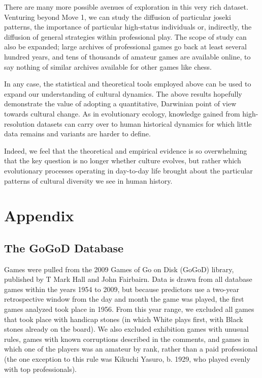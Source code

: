 \documentclass[reqno,12pt]{amsart}
\begin{document}
There are many more possible avenues of exploration in this very rich
dataset. Venturing beyond Move 1, we can study the diffusion of
particular joseki patterns, the importance of particular high-status
individuals or, indirectly, the diffusion of general strategies within
professional play. The scope of study can also be expanded; large
archives of professional games go back at least several hundred years,
and tens of thousands of amateur games are available online, to say
nothing of similar archives available for other games like chess.

In any case, the statistical and theoretical tools employed above can be
used to expand our understanding of cultural dynamics. The above results
hopefully demonstrate the value of adopting a quantitative, Darwinian
point of view towards cultural change. As in evolutionary ecology,
knowledge gained from high-resolution datasets can carry over to human
historical dynamics for which little data remains and variants are
harder to define.

Indeed, we feel that the theoretical and empirical evidence is so
overwhelming that the key question is no longer whether culture evolves,
but rather which evolutionary processes operating in day-to-day life
brought about the particular patterns of cultural diversity we see in
human history.



\newpage

\section{Appendix}\label{appendix}

\subsection{The GoGoD Database}\label{the-gogod-database}

Games were pulled from the 2009 Games of Go on Disk (GoGoD) library,
published by T Mark Hall and John Fairbairn. Data is drawn from all
database games within the years 1954 to 2009, but because predictors use
a two-year retrospective window from the day and month the game was
played, the first games analyzed took place in 1956. From this year
range, we excluded all games that took place with handicap stones (in
which White plays first, with Black stones already on the board). We
also excluded exhibition games with unusual rules, games with known
corruptions described in the comments, and games in which one of the
players was an amateur by rank, rather than a paid professional (the one
exception to this rule was Kikuchi Yasuro, b. 1929, who played evenly
with top professionals).
\end{document}
